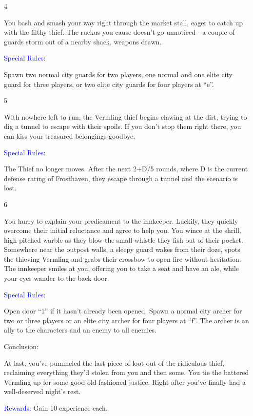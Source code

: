 \documentclass[fontsize=11pt]{scrartcl}
\begin{document}
\begin{multicols*}{3}
		\begin{center}
		  {\myfont\large{\textcolor{Sepia}{4}}}
		\end{center}
		\footnotesize{You bash and smash your way right through the market stall, eager to catch up with the filthy thief. The ruckus you cause doesn’t go unnoticed - a couple of guards storm out of a nearby shack, weapons drawn.}
		\begin{center}
	    {\myfont\normalsize{\textcolor{Blue}{Special Rules:}}}
		\end{center}
		\footnotesize{Spawn two normal city guards for two players, one normal and one elite city guard for three players, or two elite city guards for four players at “e”.}
		\begin{center}
		  {\myfont\large{\textcolor{Sepia}{5}}}
		\end{center}
		\footnotesize{With nowhere left to run, the Vermling thief begins clawing at the dirt, trying to dig a tunnel to escape with their spoils. If you don’t stop them right there, you can kiss your treasured belongings goodbye.}
		\begin{center}
	    {\myfont\normalsize{\textcolor{Blue}{Special Rules:}}}
		\end{center}
		\footnotesize{The Thief no longer moves. After the next 2+D/5 rounds, where D is the current defense rating of Frosthaven, they escape through a tunnel and the scenario is lost.}
		\begin{center}
		 {\myfont \large{\textcolor{Sepia}{6}}}
		\end{center}
		\footnotesize{You hurry to explain your predicament to the innkeeper. Luckily, they quickly overcome their initial reluctance and agree to help you. You wince at the shrill, high-pitched warble as they blow the small whistle they fish out of their pocket. Somewhere near the outpost walls, a sleepy guard wakes from their doze, spots the thieving Vermling and grabs their crossbow to open fire without hesitation. The innkeeper smiles at you, offering you to take a seat and have an ale, while your eyes wander to the back door.}
		\begin{center}
	    {\myfont\normalsize{\textcolor{Blue}{Special Rules:}}}
		\end{center}
		\footnotesize{Open door “1” if it hasn’t already been opened. Spawn a normal city archer for two or three players or an elite city archer for four players at “f”. The archer is an ally to the characters and an enemy to all enemies.}
				\begin{center}
		  {\myfont\LARGE{\textcolor{OliveGreen}{Conclusion:}}}
		\end{center}
		\footnotesize{At last, you’ve pummeled the last piece of loot out of the ridiculous thief, reclaiming everything they’d stolen from you and then some. You tie the battered Vermling up for some good old-fashioned justice. Right after you’ve finally had a well-deserved night’s rest.}
		\begin{center}
		  {\myfont\normalsize{\textcolor{Blue}{Rewards:}}}\newline
		  \footnotesize{Gain 10 experience each.}
		\end{center}
		\end{multicols*}
\end{document}
